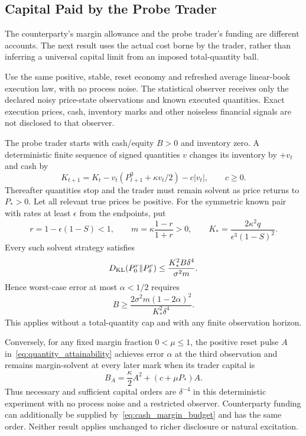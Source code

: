 \subsection{Capital Paid by the Probe Trader}
\label{sec:trader_capital}
The counterparty's margin allowance and the probe trader's funding are different accounts. The next result uses the actual cost borne by the trader, rather than inferring a universal capital limit from an imposed total-quantity ball.

\begin{theorem}
\label{thm:trader_capital_frontier}
Use the same positive, stable, reset economy and refreshed average linear-book execution law, with no process noise. The statistical observer receives only the declared noisy price-state observations and known executed quantities. Exact execution prices, cash, inventory marks and other noiseless financial signals are not disclosed to that observer.

The probe trader starts with cash/equity $B>0$ and inventory zero. A deterministic finite sequence of signed quantities $v$ changes its inventory by $+v_t$ and cash by
\[
K_{t+1}=K_t-v_t(P^0_{t+1}+\kappa v_t/2)-c|v_t|,
\qquad c\ge0.
\]
Thereafter quantities stop and the trader must remain solvent as price returns to $P_*>0$. Let all relevant true prices be positive. For the symmetric known pair with rates at least $\epsilon$ from the endpoints, put
\[
r=1-\epsilon(1-S)<1,\qquad
m=\kappa\frac{1-r}{1+r}>0,
\qquad K_*=\frac{2\kappa^2q}{\epsilon^3(1-S)^2}.
\]
Every such solvent strategy satisfies
\begin{equation}
D_{\rm KL}(P_0^v\|P_\delta^v)
\le \frac{K_*^2B\delta^4}{\sigma^2m}.
\label{eq:trader_capital_information}
\end{equation}
Hence worst-case error at most $\alpha<1/2$ requires
\begin{equation}
B\ge\frac{2\sigma^2m(1-2\alpha)^2}{K_*^2\delta^4}.
\label{eq:capital_lower_order}
\end{equation}
This applies without a total-quantity cap and with any finite observation horizon.

Conversely, for any fixed margin fraction $0<\mu\le1$, the positive reset pulse $A$ in~\eqref{eq:quantity_attainability} achieves error $\alpha$ at the third observation and remains margin-solvent at every later mark when its trader capital is
\begin{equation}
B_A=\frac\kappa2A^2+(c+\mu P_*)A.
\label{eq:trader_pulse_capital}
\end{equation}
Thus necessary and sufficient capital orders are $\delta^{-4}$ in this deterministic experiment with no process noise and a restricted observer. Counterparty funding can additionally be supplied by~\eqref{eq:cash_margin_budget} and has the same order. Neither result applies unchanged to richer disclosure or natural excitation.
\end{theorem}

